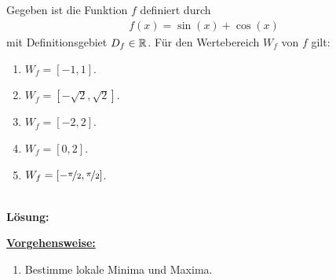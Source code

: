 \newpage
\subsection*{}
Gegeben ist die Funktion $ f $ definiert durch
\begin{align*}
	f(x) = \sin(x) + \cos(x)
\end{align*}
mit Definitionsgebiet $ D_f \in \mathbb{R} $. Für den Wertebereich $ W_f $ von $ f $ gilt:
\renewcommand{\labelenumi}{(\alph{enumi})}
\begin{enumerate}
	\item 
	$ W_f = [-1,1] $.
	\item
	$ W_f = [-\sqrt{2},\sqrt{2}] $.
	\item
	$ W_f = [-2,2] $.
	\item
	$ W_f = [0,2] $.
	\item
	$ W_f = [-\nicefrac{\pi }{2}, \nicefrac{\pi }{2}] $.
\end{enumerate}
\ \\
\textbf{Lösung:}
\begin{mdframed}
\underline{\textbf{Vorgehensweise:}}
\renewcommand{\labelenumi}{\theenumi.}
\begin{enumerate}
\item Bestimme lokale Minima und Maxima.
\end{enumerate}
\end{mdframed}

